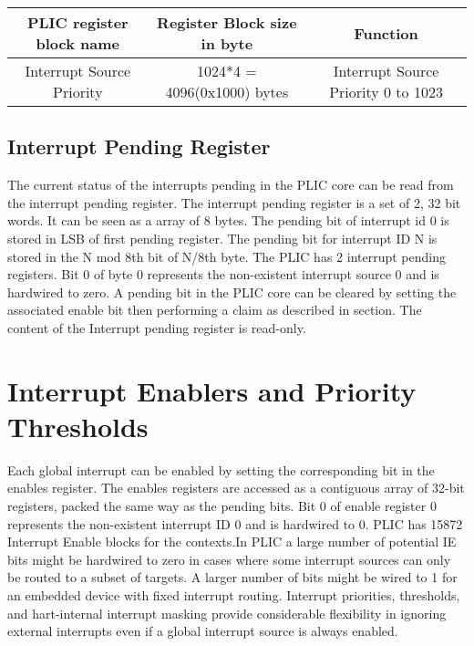  \begin{center}
 \begin{tabular}{|c|c|c|} 
 \hline
PLIC register block name & Register Block size in byte & Function \\ [0.5ex] 
 \hline
 Interrupt Source Priority & 1024*4 = 4096(0x1000) bytes & Interrupt Source Priority 0 to 1023  \\ [1ex]
 \hline
\end{tabular}

\end{center}

\subsection{Interrupt Pending Register}

The current status of the interrupts pending in the PLIC core can be read from the interrupt pending register. The interrupt pending register is a set of 2, 32 bit words. It can be seen as a array of 8 bytes. The pending bit of interrupt id 0 is stored in LSB of first pending register. The pending bit for interrupt ID N is stored in the N mod 8th bit of N/8th byte. The PLIC has 2 interrupt pending registers. Bit 0 of byte 0 represents the non-existent interrupt source 0 and is hardwired to zero. A pending bit in the PLIC core can be cleared by setting the associated enable bit then performing a claim as described in section. The content of the Interrupt pending register is
read-only.


\section{Interrupt Enablers and Priority Thresholds}
Each global interrupt can be enabled by setting the corresponding bit in the enables register. The enables registers are accessed as a contiguous array of 32-bit registers, packed the same way as the pending bits. Bit 0 of enable register 0 represents the non-existent interrupt ID 0 and is hardwired to 0. PLIC has 15872 Interrupt Enable blocks for the contexts.In PLIC a large number of potential IE bits might be hardwired to zero in cases where some interrupt sources can only be routed to a subset of targets. A larger number of bits might be wired to 1 for an embedded device with fixed interrupt routing. Interrupt priorities, thresholds, and hart-internal interrupt masking provide considerable flexibility in ignoring external interrupts even if a global interrupt source is always enabled.

